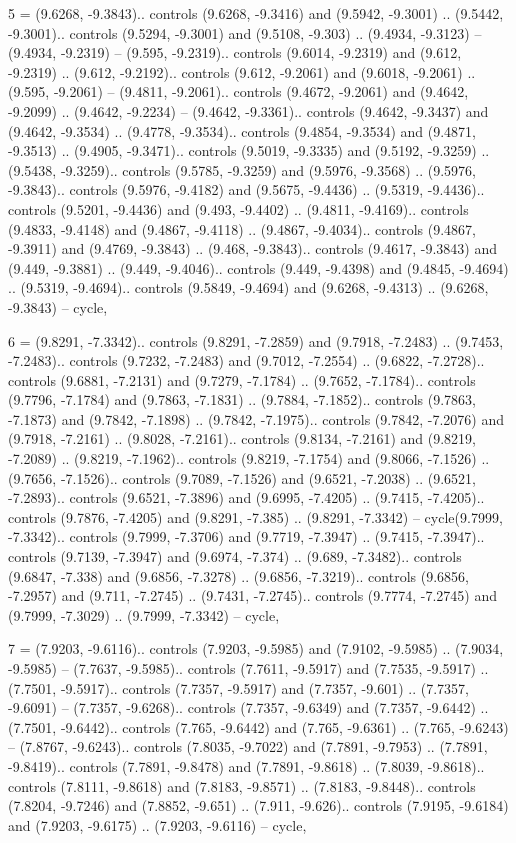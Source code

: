 5 = {(9.6268, -9.3843).. controls (9.6268, -9.3416) and (9.5942, -9.3001) .. (9.5442, -9.3001).. controls (9.5294, -9.3001) and (9.5108, -9.303) .. (9.4934, -9.3123) -- (9.4934, -9.2319) -- (9.595, -9.2319).. controls (9.6014, -9.2319) and (9.612, -9.2319) .. (9.612, -9.2192).. controls (9.612, -9.2061) and (9.6018, -9.2061) .. (9.595, -9.2061) -- (9.4811, -9.2061).. controls (9.4672, -9.2061) and (9.4642, -9.2099) .. (9.4642, -9.2234) -- (9.4642, -9.3361).. controls (9.4642, -9.3437) and (9.4642, -9.3534) .. (9.4778, -9.3534).. controls (9.4854, -9.3534) and (9.4871, -9.3513) .. (9.4905, -9.3471).. controls (9.5019, -9.3335) and (9.5192, -9.3259) .. (9.5438, -9.3259).. controls (9.5785, -9.3259) and (9.5976, -9.3568) .. (9.5976, -9.3843).. controls (9.5976, -9.4182) and (9.5675, -9.4436) .. (9.5319, -9.4436).. controls (9.5201, -9.4436) and (9.493, -9.4402) .. (9.4811, -9.4169).. controls (9.4833, -9.4148) and (9.4867, -9.4118) .. (9.4867, -9.4034).. controls (9.4867, -9.3911) and (9.4769, -9.3843) .. (9.468, -9.3843).. controls (9.4617, -9.3843) and (9.449, -9.3881) .. (9.449, -9.4046).. controls (9.449, -9.4398) and (9.4845, -9.4694) .. (9.5319, -9.4694).. controls (9.5849, -9.4694) and (9.6268, -9.4313) .. (9.6268, -9.3843) -- cycle},

6 = {(9.8291, -7.3342).. controls (9.8291, -7.2859) and (9.7918, -7.2483) .. (9.7453, -7.2483).. controls (9.7232, -7.2483) and (9.7012, -7.2554) .. (9.6822, -7.2728).. controls (9.6881, -7.2131) and (9.7279, -7.1784) .. (9.7652, -7.1784).. controls (9.7796, -7.1784) and (9.7863, -7.1831) .. (9.7884, -7.1852).. controls (9.7863, -7.1873) and (9.7842, -7.1898) .. (9.7842, -7.1975).. controls (9.7842, -7.2076) and (9.7918, -7.2161) .. (9.8028, -7.2161).. controls (9.8134, -7.2161) and (9.8219, -7.2089) .. (9.8219, -7.1962).. controls (9.8219, -7.1754) and (9.8066, -7.1526) .. (9.7656, -7.1526).. controls (9.7089, -7.1526) and (9.6521, -7.2038) .. (9.6521, -7.2893).. controls (9.6521, -7.3896) and (9.6995, -7.4205) .. (9.7415, -7.4205).. controls (9.7876, -7.4205) and (9.8291, -7.385) .. (9.8291, -7.3342) -- cycle(9.7999, -7.3342).. controls (9.7999, -7.3706) and (9.7719, -7.3947) .. (9.7415, -7.3947).. controls (9.7139, -7.3947) and (9.6974, -7.374) .. (9.689, -7.3482).. controls (9.6847, -7.338) and (9.6856, -7.3278) .. (9.6856, -7.3219).. controls (9.6856, -7.2957) and (9.711, -7.2745) .. (9.7431, -7.2745).. controls (9.7774, -7.2745) and (9.7999, -7.3029) .. (9.7999, -7.3342) -- cycle},

7 = {(7.9203, -9.6116).. controls (7.9203, -9.5985) and (7.9102, -9.5985) .. (7.9034, -9.5985) -- (7.7637, -9.5985).. controls (7.7611, -9.5917) and (7.7535, -9.5917) .. (7.7501, -9.5917).. controls (7.7357, -9.5917) and (7.7357, -9.601) .. (7.7357, -9.6091) -- (7.7357, -9.6268).. controls (7.7357, -9.6349) and (7.7357, -9.6442) .. (7.7501, -9.6442).. controls (7.765, -9.6442) and (7.765, -9.6361) .. (7.765, -9.6243) -- (7.8767, -9.6243).. controls (7.8035, -9.7022) and (7.7891, -9.7953) .. (7.7891, -9.8419).. controls (7.7891, -9.8478) and (7.7891, -9.8618) .. (7.8039, -9.8618).. controls (7.8111, -9.8618) and (7.8183, -9.8571) .. (7.8183, -9.8448).. controls (7.8204, -9.7246) and (7.8852, -9.651) .. (7.911, -9.626).. controls (7.9195, -9.6184) and (7.9203, -9.6175) .. (7.9203, -9.6116) -- cycle},

